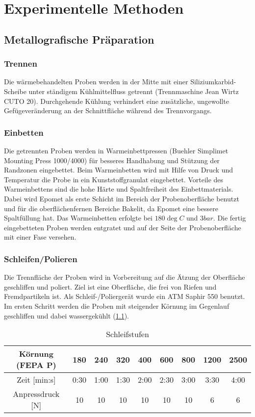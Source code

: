 \chapter{Experimentelle Methoden}

\section {Metallografische Präparation}

\subsection{Trennen}
Die wärmebehandelten Proben werden in der Mitte mit einer Siliziumkarbid-Scheibe unter ständigem Kühlmittelfluss getrennt (Trennmaschine Jean Wirtz CUTO 20). Durchgehende Kühlung  verhindert eine zusätzliche, ungewollte Gefügeveränderung an der Schnittfläche während des Trennvorgangs.


\subsection{Einbetten}
Die getrennten Proben werden in Warmeinbettpressen (Buehler Simplimet Mounting Press 1000/4000) für besseres Handhabung und Stützung der Randzonen eingebettet. Beim Warmeinbetten wird mit Hilfe von Druck und Temperatur die Probe in ein Kunststoffgranulat eingebettet. Vorteile des Warmeinbettens sind die hohe Härte und Spaltfreiheit des Einbettmaterials. Dabei wird Epomet als erste Schicht im Bereich der Probenoberfläche benutzt und für die oberflächenfernen Bereiche Bakelit, da Epomet eine bessere Spaltfüllung hat. Das Warmeinbetten erfolgte bei $180 \deg C$ und $3 bar$. 
Die fertig eingebetteten Proben werden entgratet und auf der Seite der Probenoberfläche mit einer Fase versehen.  


\subsection{Schleifen/Polieren}

Die Trennfläche der Proben wird in Vorbereitung auf die Ätzung der Oberfläche geschliffen und poliert. Ziel ist eine Oberfläche, die frei von Riefen und Fremdpartikeln ist. Als Schleif-/Poliergerät wurde ein ATM Saphir 550 benutzt.
Im ersten Schritt werden die Proben mit steigender Körnung im Gegenlauf geschliffen und dabei wassergekühlt (\ref{tab:Schleifstufen}). 

\begin{table}[h]
	\centering
	\begin{tabular}{|c|c|c|c|c|c|c|c|c|}
		
		\hline 
		Körnung (FEPA P) & 180 & 240 & 320 & 400 & 600 & 800 & 1200 & 2500 \\ 
		\hline 
		Zeit [min:s] & 0:30 & 1:00 & 1:30 & 2:00 & 2:30 & 3:00 & 3:30 & 4:00 \\ 
		\hline 
		Anpressdruck [N] & 10&10&10&10&10&10&6&6\\
		\hline
	\end{tabular} 
	\caption{Schleifstufen}
	\label{tab:Schleifstufen}
\end{table}

